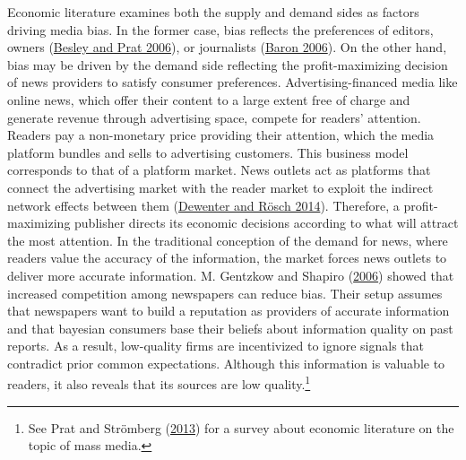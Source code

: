 \documentclass[
  12pt,
]{article}
\begin{document}
Economic literature examines both the supply and demand sides as factors
driving media bias. In the former case, bias reflects the preferences of
editors, owners (\protect\hyperlink{ref-besley_handcuffs_2006}{Besley
and Prat 2006}), or journalists
(\protect\hyperlink{ref-baron_persistent_2006}{Baron 2006}). On the
other hand, bias may be driven by the demand side reflecting the
profit-maximizing decision of news providers to satisfy consumer
preferences. Advertising-financed media like online news, which offer
their content to a large extent free of charge and generate revenue
through advertising space, compete for readers' attention. Readers pay a
non-monetary price providing their attention, which the media platform
bundles and sells to advertising customers. This business model
corresponds to that of a platform market. News outlets act as platforms
that connect the advertising market with the reader market to exploit
the indirect network effects between them
(\protect\hyperlink{ref-dewenter_einfuhrung_2014}{Dewenter and Rösch
2014}). Therefore, a profit-maximizing publisher directs its economic
decisions according to what will attract the most attention. In the
traditional conception of the demand for news, where readers value the
accuracy of the information, the market forces news outlets to deliver
more accurate information. M. Gentzkow and Shapiro
(\protect\hyperlink{ref-gentzkow_media_2006}{2006}) showed that
increased competition among newspapers can reduce bias. Their setup
assumes that newspapers want to build a reputation as providers of
accurate information and that bayesian consumers base their beliefs
about information quality on past reports. As a result, low-quality
firms are incentivized to ignore signals that contradict prior common
expectations. Although this information is valuable to readers, it also
reveals that its sources are low quality.\footnote{See Prat and
  Strömberg (\protect\hyperlink{ref-acemoglu_political_2013}{2013}) for
  a survey about economic literature on the topic of mass media.}
\end{document}
